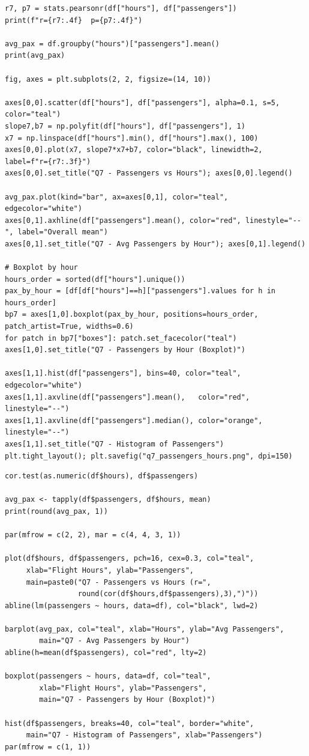 \documentclass[12pt, a4paper]{report}
\begin{document}
\begin{lstlisting}[style=python, caption={Python — Passenger vs.\ duration correlation and visualisations}]
r7, p7 = stats.pearsonr(df["hours"], df["passengers"])
print(f"r={r7:.4f}  p={p7:.4f}")

avg_pax = df.groupby("hours")["passengers"].mean()
print(avg_pax)

fig, axes = plt.subplots(2, 2, figsize=(14, 10))

axes[0,0].scatter(df["hours"], df["passengers"], alpha=0.1, s=5, color="teal")
slope7,b7 = np.polyfit(df["hours"], df["passengers"], 1)
x7 = np.linspace(df["hours"].min(), df["hours"].max(), 100)
axes[0,0].plot(x7, slope7*x7+b7, color="black", linewidth=2, label=f"r={r7:.3f}")
axes[0,0].set_title("Q7 - Passengers vs Hours"); axes[0,0].legend()

avg_pax.plot(kind="bar", ax=axes[0,1], color="teal", edgecolor="white")
axes[0,1].axhline(df["passengers"].mean(), color="red", linestyle="--", label="Overall mean")
axes[0,1].set_title("Q7 - Avg Passengers by Hour"); axes[0,1].legend()

# Boxplot by hour
hours_order = sorted(df["hours"].unique())
pax_by_hour = [df[df["hours"]==h]["passengers"].values for h in hours_order]
bp7 = axes[1,0].boxplot(pax_by_hour, positions=hours_order, patch_artist=True, widths=0.6)
for patch in bp7["boxes"]: patch.set_facecolor("teal")
axes[1,0].set_title("Q7 - Passengers by Hour (Boxplot)")

axes[1,1].hist(df["passengers"], bins=40, color="teal", edgecolor="white")
axes[1,1].axvline(df["passengers"].mean(),   color="red",    linestyle="--")
axes[1,1].axvline(df["passengers"].median(), color="orange", linestyle="--")
axes[1,1].set_title("Q7 - Histogram of Passengers")
plt.tight_layout(); plt.savefig("q7_passengers_hours.png", dpi=150)
\end{lstlisting}

\begin{lstlisting}[style=Rcode, caption={R — Passenger vs.\ duration correlation and visualisations}]
cor.test(as.numeric(df$hours), df$passengers)

avg_pax <- tapply(df$passengers, df$hours, mean)
print(round(avg_pax, 1))

par(mfrow = c(2, 2), mar = c(4, 4, 3, 1))

plot(df$hours, df$passengers, pch=16, cex=0.3, col="teal",
     xlab="Flight Hours", ylab="Passengers",
     main=paste0("Q7 - Passengers vs Hours (r=",
                 round(cor(df$hours,df$passengers),3),")"))
abline(lm(passengers ~ hours, data=df), col="black", lwd=2)

barplot(avg_pax, col="teal", xlab="Hours", ylab="Avg Passengers",
        main="Q7 - Avg Passengers by Hour")
abline(h=mean(df$passengers), col="red", lty=2)

boxplot(passengers ~ hours, data=df, col="teal",
        xlab="Flight Hours", ylab="Passengers",
        main="Q7 - Passengers by Hour (Boxplot)")

hist(df$passengers, breaks=40, col="teal", border="white",
     main="Q7 - Histogram of Passengers", xlab="Passengers")
par(mfrow = c(1, 1))
\end{lstlisting}
\end{document}

